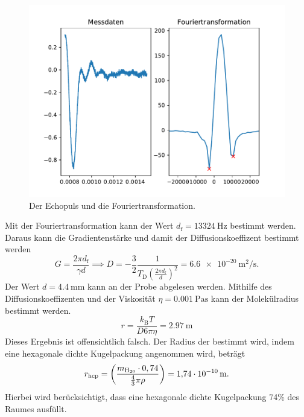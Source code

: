 \begin{figure}
  \centering
  \includegraphics[width = \textwidth,keepaspectratio]{figure/Fouriertrafo.pdf}
  \caption{Der Echopuls und die Fouriertransformation.}
\end{figure}
\FloatBarrier
Mit der Fouriertransformation kann der Wert $d_{\text{f}} = \SI{13324}{\hertz}$ bestimmt werden.
Daraus kann die Gradientenstärke und damit der Diffusionskoeffizent bestimmt werden
\begin{equation*}
  G=\frac{2\pi d_{\text{f}}}{\gamma d} \implies D = -\frac{3}{2} \frac{1}{T_{\text{D}} \left(\frac{2\pi d_{\text{f}}}{d}\right)^2}=\SI{6.6e-20}{\square\meter\per\second}.
\end{equation*}
Der Wert $d=\SI{4.4}{\milli\meter}$ kann an der Probe abgelesen werden.
Mithilfe des Diffusionskoeffizenten und der Viskosität $\eta = \SI{0.001}{\pascal\second}$ kann der Molekülradius bestimmt werden. 
\begin{equation*}
  r=\frac{k_{\text{B}}T}{D6\pi \eta} = \SI{2.97}{\meter}
\end{equation*}
Dieses Ergebnis ist offensichtlich falsch.
Der Radius der bestimmt wird, indem eine hexagonale dichte Kugelpackung angenommen wird, beträgt 
\begin{equation*}
  r_{\text{hcp}} = \left(\frac{m_{\ce{H20}}\cdot 0,74}{\frac{4}{3}\pi \rho}\right)= \SI{1.74e-10}{\meter}.
\end{equation*}
Hierbei wird berücksichtigt, dass eine hexagonale dichte Kugelpackung 74\% des Raumes ausfüllt.